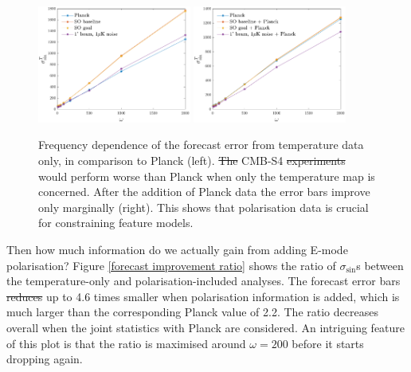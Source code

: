 \documentclass[a4paper,12pt,times,custombib,print,index]{Classes/PhDThesisPSnPDF} %
\providecommand{\DIFadd}[1]{{\protect\color{blue}\uwave{#1}}} %
\providecommand{\DIFdel}[1]{{\protect\color{red}\sout{#1}}}                      %
\providecommand{\DIFaddbegin}{} %
\providecommand{\DIFaddend}{} %
\providecommand{\DIFdelbegin}{} %
\providecommand{\DIFdelend}{} %
\providecommand{\DIFdelFL}[1]{\DIFdel{#1}} %
\providecommand{\DIFdelbeginFL}{} %
\providecommand{\DIFdelendFL}{} %
\newcommand{\DIFscaledelfig}{0.5}
\newlength{\DIFdelgraphicswidth} %
\newlength{\DIFdelgraphicsheight} %
\newcommand{\DIFaddincludegraphics}[2][]{{\color{blue}\fbox{\DIFOincludegraphics[#1]{#2}}}} %
\newcommand{\DIFdelincludegraphics}[2][]{%
\sbox{\DIFdelgraphicsbox}{\DIFOincludegraphics[#1]{#2}}%
\settoboxwidth{\DIFdelgraphicswidth}{\DIFdelgraphicsbox} %
\settoboxtotalheight{\DIFdelgraphicsheight}{\DIFdelgraphicsbox} %
\scalebox{\DIFscaledelfig}{%
\parbox[b]{\DIFdelgraphicswidth}{\usebox{\DIFdelgraphicsbox}\\[-\baselineskip] \rule{\DIFdelgraphicswidth}{0em}}\llap{\resizebox{\DIFdelgraphicswidth}{\DIFdelgraphicsheight}{%
\setlength{\unitlength}{\DIFdelgraphicswidth}%
\begin{picture}(1,1)%
\thicklines\linethickness{2pt} %
{\color[rgb]{1,0,0}\put(0,0){\framebox(1,1){}}}%
{\color[rgb]{1,0,0}\put(0,0){\line( 1,1){1}}}%
{\color[rgb]{1,0,0}\put(0,1){\line(1,-1){1}}}%
\end{picture}%
}\hspace*{3pt}}} %
} %
\DeclareRobustCommand{\DIFaddbegin}{\DIFOaddbegin \let\includegraphics\DIFaddincludegraphics} %
\DeclareRobustCommand{\DIFaddend}{\DIFOaddend \let\includegraphics\DIFOincludegraphics} %
\DeclareRobustCommand{\DIFdelbegin}{\DIFOdelbegin \let\includegraphics\DIFdelincludegraphics} %
\DeclareRobustCommand{\DIFdelend}{\DIFOaddend \let\includegraphics\DIFOincludegraphics} %
\DeclareRobustCommand{\DIFdelbeginFL}{\DIFOdelbeginFL \let\includegraphics\DIFdelincludegraphics} %
\DeclareRobustCommand{\DIFdelendFL}{\DIFOaddendFL \let\includegraphics\DIFOincludegraphics} %
\begin{document}
\begin{figure}[ht]
	\centering
	\includegraphics[width=0.45\textwidth]{omega_dependence_T.pdf}
	\includegraphics[width=0.45\textwidth]{omega_dependence_combined_T.pdf}
	\caption{Frequency dependence of the forecast error from temperature data only, in comparison to Planck (left). \DIFdelbeginFL \DIFdelFL{The }\DIFdelendFL CMB-S4 \DIFdelbeginFL \DIFdelFL{experiments }\DIFdelendFL would perform worse than Planck when only the temperature map is concerned. After the addition of Planck data the error bars improve only marginally (right). This shows that polarisation data is crucial for constraining feature models.}
	\label{forecast omega dependence T}
\end{figure}

Then how much information do we actually gain from adding E-mode polarisation? Figure \ref{forecast improvement ratio} shows the ratio of $\sigma_{\sin}$s between the temperature-only and polarisation-included analyses. The forecast error bars \DIFdelbegin \DIFdel{reduces }\DIFdelend \DIFaddbegin \DIFadd{reduce }\DIFaddend up to 4.6 times smaller when polarisation information is added, which is much larger than the corresponding Planck value of 2.2. The ratio decreases overall when the joint statistics with Planck are considered. An intriguing feature of this plot is that the ratio is maximised around $\omega=200$ before it starts dropping again.
\end{document}
